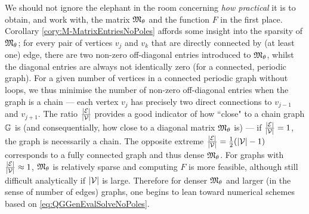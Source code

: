 We should not ignore the elephant in the room concerning \emph{how practical} it is to obtain, and work with, the matrix $\mathfrak{M}_\theta$ and the function $F$ in the first place.
Corollary \ref{cory:M-MatrixEntriesNoPoles} affords some insight into the sparsity of $\mathfrak{M}_{\theta}$; for every pair of vertices $v_j$ and $v_k$ that are directly connected by (at least one) edge, there are two non-zero off-diagonal entries introduced to $\mathfrak{M}_{\theta}$, whilst the diagonal entries are always not identically zero (for a connected, periodic graph).
For a given number of vertices in a connected periodic graph without loops, we thus minimise the number of non-zero off-diagonal entries when the graph is a chain --- each vertex $v_j$ has precisely two direct connections to $v_{j-1}$ and $v_{j+1}$.
The ratio $\frac{\left\lvert \mathcal{E} \right\rvert}{\left\lvert \mathcal{V} \right\rvert}$ provides a good indicator of how ``close" to a chain graph $\mathbb{G}$ is (and consequentially, how close to a diagonal matrix $\mathfrak{M}_\theta$ is) --- if $\frac{\left\lvert \mathcal{E} \right\rvert}{\left\lvert \mathcal{V} \right\rvert} = 1$, the graph is necessarily a chain.
The opposite extreme $\frac{\left\lvert \mathcal{E} \right\rvert}{\left\lvert \mathcal{V} \right\rvert} = \frac{1}{2}(\left\lvert \mathcal{V} \right\rvert-1)$ corresponds to a fully connected graph and thus dense $\mathfrak{M}_\theta$.
For graphs with $\frac{\left\lvert \mathcal{E} \right\rvert}{\left\lvert \mathcal{V} \right\rvert} \approx 1$, $\mathfrak{M}_{\theta}$ is relatively sparse and computing $F$ is more feasible, although still difficult analytically if $\left\lvert \mathcal{V} \right\rvert$ is large.
Therefore for denser $\mathfrak{M}_\theta$ and larger (in the sense of number of edges) graphs, one begins to lean toward numerical schemes based on \eqref{eq:QGGenEvalSolveNoPoles}.
